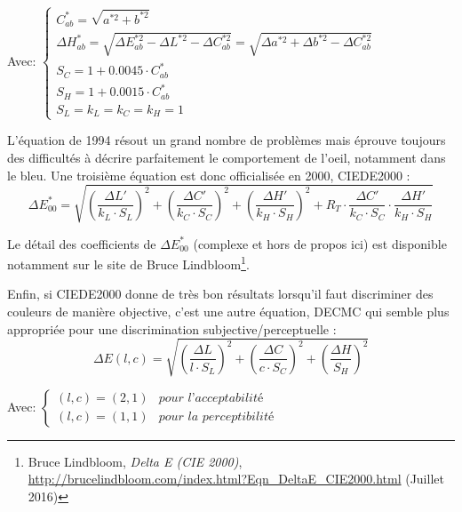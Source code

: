	\par Avec:
	$\begin{cases}
	C^\ast_{ab} = \sqrt{a^{\ast 2} + b^{\ast 2}}\\
	\Delta H^\ast_{ab} = \sqrt{\Delta E^{\ast 2}_{ab} - \Delta L^{\ast 2} - \Delta C^{\ast 2}_{ab}} = \sqrt{\Delta a^{\ast 2} + \Delta b^{\ast 2} - \Delta C^{\ast 2}_{ab}}\\
	S_C = 1 + 0.0045 \cdot C^\ast_{ab}\\
	S_H = 1 + 0.0015 \cdot C^\ast_{ab}\\
	S_L = k_L = k_C = k_H = 1
	\end{cases}$
	
	\par L'équation de 1994 résout un grand nombre de problèmes mais éprouve toujours des difficultés à décrire parfaitement le comportement de l'oeil, notamment dans le bleu. Une troisième équation est donc officialisée en 2000, CIEDE2000 \citep{schanda_colorimetry:_2007, sharma_ciede2000_2005}:
	\begin{equation}
		\Delta E^\ast_{00} = \sqrt{\left(\frac{\Delta L'}{k_L \cdot S_L}\right)^2 + \left(\frac{\Delta C'}{k_C \cdot S_C}\right)^2 + \left(\frac{\Delta H'}{k_H \cdot S_H}\right)^2 + R_T \cdot \frac{\Delta C'}{k_C \cdot S_C} \cdot \frac{\Delta H'}{k_H \cdot S_H}}
		\label{eq:de_2000}
	\end{equation}
	
	\par Le détail des coefficients de $\Delta E^\ast_{00}$ (complexe et hors de propos ici) est disponible notamment sur le site de Bruce Lindbloom\footnote{Bruce Lindbloom, \textit{Delta E (CIE 2000)}, \url{http://brucelindbloom.com/index.html?Eqn_DeltaE_CIE2000.html} (Juillet 2016)}.

	\par Enfin, si CIEDE2000 donne de très bon résultats lorsqu'il faut discriminer des couleurs de manière objective, c'est une autre équation, DECMC qui semble plus appropriée pour une discrimination subjective/perceptuelle \citep{habekost_which_2013}:
	\begin{equation}
		\Delta E(l,c) = \sqrt{\left(\frac{\Delta L}{l \cdot S_L}\right)^2 + \left(\frac{\Delta C}{c \cdot S_C}\right)^2 + \left(\frac{\Delta H}{S_H}\right)^2}
		\label{eq:de_cmc}
	\end{equation}
	
	\par Avec:
	$\begin{cases}
	(l,c) = (2,1) & \textit{pour l'acceptabilité}\\
	(l,c) = (1,1) & \textit{pour la perceptibilité}
	\end{cases}$
	
